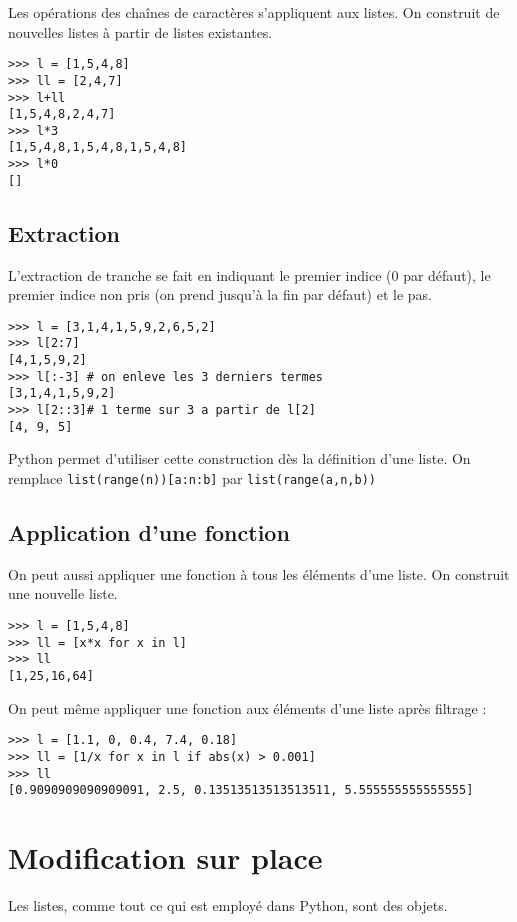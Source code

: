 Les opérations des chaînes de caractères s’appliquent aux listes. On construit de nouvelles listes à partir de listes existantes.

\begin{lstlisting}
>>> l = [1,5,4,8]
>>> ll = [2,4,7]
>>> l+ll
[1,5,4,8,2,4,7]
>>> l*3
[1,5,4,8,1,5,4,8,1,5,4,8]
>>> l*0
[]
\end{lstlisting}


\subsection{Extraction}

L’extraction de tranche se fait en indiquant le premier indice (0 par défaut), le premier indice non pris (on prend jusqu'à la fin par défaut) et le pas.


\begin{lstlisting}
>>> l = [3,1,4,1,5,9,2,6,5,2]
>>> l[2:7]
[4,1,5,9,2]
>>> l[:-3] # on enleve les 3 derniers termes
[3,1,4,1,5,9,2]
>>> l[2::3]# 1 terme sur 3 a partir de l[2]
[4, 9, 5]
\end{lstlisting}

Python permet d’utiliser cette construction dès la définition d’une liste. 
On remplace \lstinline?list(range(n))[a:n:b]? par \lstinline?list(range(a,n,b))?

\subsection{Application d'une fonction}

On peut aussi appliquer une fonction à tous les éléments d’une liste. On construit une nouvelle liste.
\begin{lstlisting}
>>> l = [1,5,4,8]
>>> ll = [x*x for x in l]
>>> ll
[1,25,16,64]
\end{lstlisting}

On peut même appliquer une fonction aux éléments d’une liste après filtrage :
\begin{lstlisting}
>>> l = [1.1, 0, 0.4, 7.4, 0.18]
>>> ll = [1/x for x in l if abs(x) > 0.001]
>>> ll
[0.9090909090909091, 2.5, 0.13513513513513511, 5.555555555555555]
\end{lstlisting}

\section{Modification sur place}

Les listes, comme tout ce qui est employé dans Python, sont des objets. 


